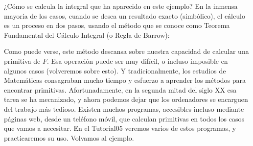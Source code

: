 ¿Cómo se calcula la integral que ha aparecido en este ejemplo? En la inmensa mayoría de los casos, cuando se desea un resultado exacto (simbólico), el cálculo es un proceso en dos pasos, usando el método que se conoce como {\sf Teorema Fundamental del Cálculo Integral} (o Regla de Barrow):
    \begin{center}
    \end{center}
Como puede verse, este método descansa sobre nuestra capacidad de calcular una primitiva de $F$. Esa operación puede ser muy difícil, o incluso imposible en algunos casos (volveremos sobre esto). Y tradicionalmente, los estudios de Matemáticas consagraban mucho tiempo y esfuerzo a aprender los métodos para encontrar primitivas. Afortunadamente, en la segunda mitad del siglo XX esa tarea se ha mecanizado, y ahora podemos dejar que los ordenadores se encarguen del trabajo más tedioso. Existen muchos programas, accesibles incluso mediante páginas web, desde un teléfono móvil, que calculan primitivas en todos los casos que vamos a necesitar. En el Tutorial05 veremos varios de estos programas, y practicaremos su uso. Volvamos al ejemplo.

